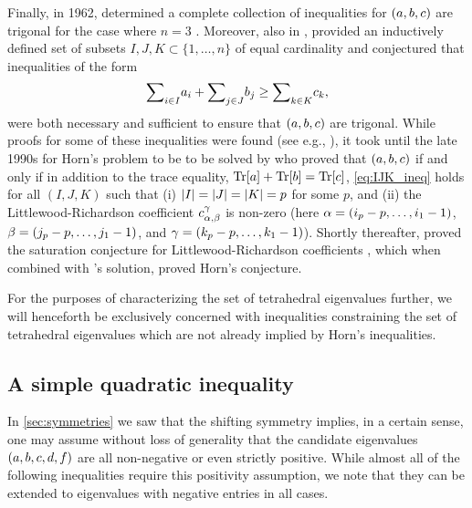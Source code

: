 \documentclass[notitlepage, 10pt]{article}
\begin{document}
Finally, in 1962, \citeauthor{horn1962eigenvalues} determined a complete collection of inequalities for $(a,b,c)$ are trigonal for the case where $n=3$ \cite{horn1962eigenvalues}.
Moreover, also in \cite{horn1962eigenvalues}, \citeauthor{horn1962eigenvalues} provided an inductively defined set of subsets $I,J,K \subset \{1,\ldots, n\}$ of equal cardinality and conjectured that inequalities of the form
\begin{equation}
    \label{eq:IJK_ineq}
    {\sum}_{i\in I} a_i + {\sum}_{j\in J} b_j \geq {\sum}_{k\in K} c_{k},
\end{equation}
were both necessary and sufficient to ensure that $(a,b,c)$ are trigonal.
While proofs for some of these inequalities were found (see e.g., \cite{thompson1971eigenvalues,thompson1970eigenvalues}), it took until the late 1990s for Horn's problem to be to be solved by \citeauthor{klyachko1998stable} \cite{klyachko1998stable} who proved that $(a,b,c)$ if and only if in addition to the trace equality, ${\operatorname{Tr}[a]} + {\operatorname{Tr}[b]} = {\operatorname{Tr}[c]}$, \cref{eq:IJK_ineq} holds for all $(I,J,K)$ such that (i) $\left|I\right| = \left|J\right| = \left|K\right| = p$ for some $p$, and (ii) the Littlewood-Richardson coefficient $c^{\gamma}_{\alpha,\beta}$ is non-zero (here $\alpha = (i_p - p, \ldots, i_1 - 1)$, $\beta = (j_p - p, \ldots, j_1 - 1)$, and $\gamma = (k_p - p, \ldots, k_1 - 1)$).
Shortly thereafter, \citeauthor{knutson1999honeycomb} proved the saturation conjecture for Littlewood-Richardson coefficients \cite{knutson1999honeycomb}, which when combined with \citeauthor{klyachko1998stable}'s solution, proved Horn's conjecture.

For the purposes of characterizing the set of tetrahedral eigenvalues further, we will henceforth be exclusively concerned with inequalities constraining the set of tetrahedral eigenvalues which are not already implied by Horn's inequalities.

\subsection{A simple quadratic inequality}

In \cref{sec:symmetries} we saw that the shifting symmetry implies, in a certain sense, one may assume without loss of generality that the candidate eigenvalues $(a,b,c,d,f)$ are all non-negative or even strictly positive.
While almost all of the following inequalities require this positivity assumption, we note that they can be extended to eigenvalues with negative entries in all cases.
\end{document}
